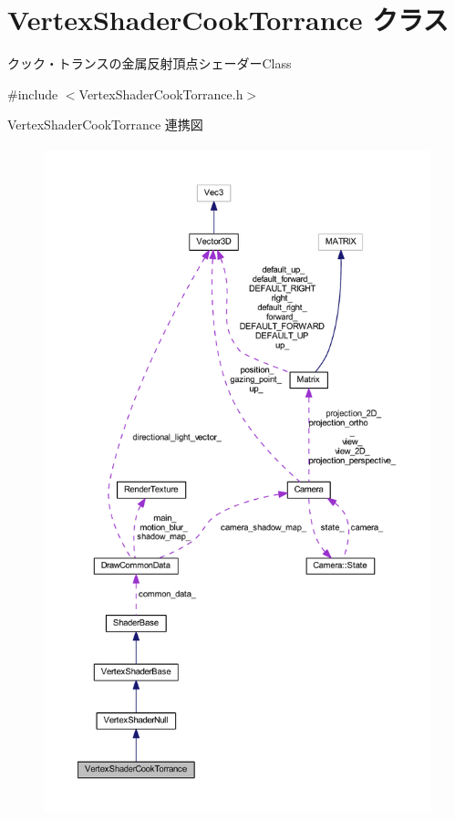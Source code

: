 \hypertarget{class_vertex_shader_cook_torrance}{}\section{Vertex\+Shader\+Cook\+Torrance クラス}
\label{class_vertex_shader_cook_torrance}


クック・トランスの金属反射頂点シェーダー\+Class  




{\ttfamily \#include $<$Vertex\+Shader\+Cook\+Torrance.\+h$>$}



Vertex\+Shader\+Cook\+Torrance 連携図\nopagebreak
\begin{figure}[H]
\begin{center}
\leavevmode
\includegraphics[height=550pt]{class_vertex_shader_cook_torrance__coll__graph}
\end{center}
\end{figure}
